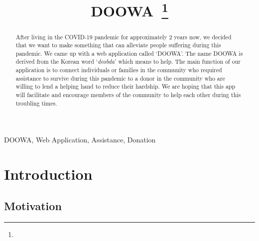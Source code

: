 \documentclass[conference]{IEEEtran}
\begin{document}
\title{DOOWA\
\thanks{}
}

\author{
\and
{}
\and
{}
}

\maketitle

\begin{abstract}
After living in the COVID-19 pandemic for approximately 2 years now, we decided that we want to make something that can alleviate people suffering during this pandemic. We came up with a web application called ‘DOOWA’. The name DOOWA is derived from the Korean word ‘\textit{deobda}’ which means to help. The main function of our application is to connect individuals or families in the community who required assistance to survive during this pandemic to a donor in the community who are willing to lend a helping hand to reduce their hardship. We are hoping that this app will facilitate and encourage members of the community to help each other during this troubling times.

\end{abstract}
\begin{IEEEkeywords}
DOOWA, Web Application, Assistance, Donation
\end{IEEEkeywords}

\section{Introduction}
\subsection{Motivation}
\end{document}
